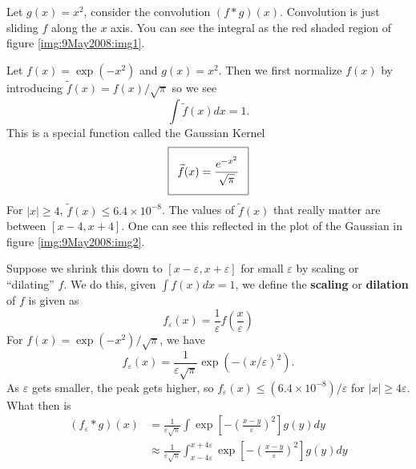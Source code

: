 \begin{ex}
Let $g(x)=x^2$, consider the convolution
$(f*g)(x)$. Convolution is just sliding $f$ along the $x$ 
axis. You can see the integral as the red shaded region of
figure \eqref{img:9May2008:img1}.
\end{ex}

\begin{ex}
Let $f(x)=\exp(-x^2)$ and $g(x)=x^2$. Then we first
normalize $f(x)$ by introducing
$\widetilde{f}(x)=f(x)/\sqrt{\pi}$ so we see
\begin{equation}
\int\widetilde{f}(x)dx = 1.
\end{equation}
This is a special function called the Gaussian
Kernel
\begin{equation}
  \addtolength{\fboxsep}{5pt}
   \boxed{
   \begin{gathered}
     \widetilde{f}(x) = \frac{e^{-x^2}}{\sqrt{\pi}}
   \end{gathered}
   }
\end{equation}
For $|x|\geq 4$, $\widetilde{f}(x)\leq 6.4\times
10^{-8}$. The values of $\widetilde{f}(x)$ that really
matter are between $[x-4,x+4]$. One can see this reflected
in the plot of the Gaussian in figure \eqref{img:9May2008:img2}.

Suppose we shrink this down to
$[x-\varepsilon,x+\varepsilon]$ for small $\varepsilon$ by
scaling or ``dilating'' $f$. We do this, given $\int
f(x)dx=1$, we define the 
\textbf{scaling} or \textbf{dilation}
of $f$ is given as
\begin{equation}
f_{\varepsilon}(x) = \frac{1}{\varepsilon}f\left(\frac{x}{\varepsilon}\right)
\end{equation}
For $f(x)=\exp(-x^2)/\sqrt{\pi}$, we have
\begin{equation}
f_{\varepsilon}(x) = \frac{1}{\varepsilon\sqrt{\pi}}\exp(-(x/\varepsilon)^2).
\end{equation}
As $\varepsilon$ gets smaller, the peak gets higher, so
$f_{\varepsilon}(x)\leq(6.4\times10^{-8})/\varepsilon$ for
$|x|\geq4\varepsilon$. What then is
\begin{subequations}
\begin{align}
(f_{\varepsilon}*g)(x) &= \frac{1}{\varepsilon\sqrt{\pi}}\int\exp\left[-\left(\frac{x-y}{\varepsilon}\right)^{2}\right]g(y)dy\\
&\approx \frac{1}{\varepsilon\sqrt{\pi}}\int^{x+4\varepsilon}_{x-4\varepsilon}\exp\left[-\left(\frac{x-y}{\varepsilon}\right)^{2}\right]g(y)dy
\end{align}
\end{subequations}
\end{ex}

